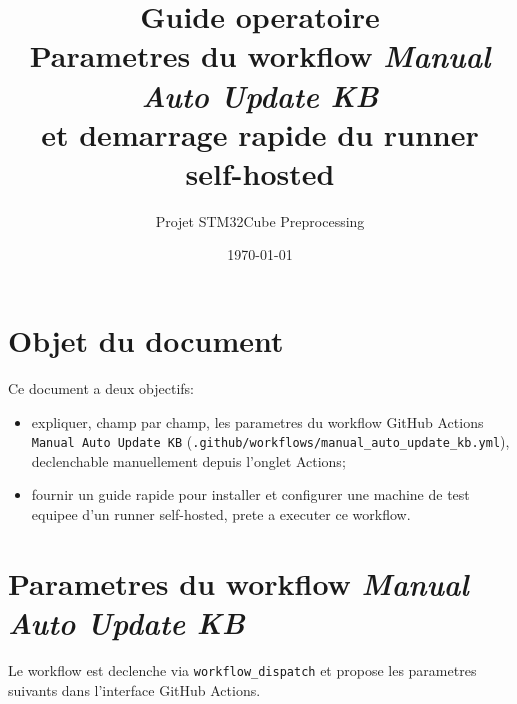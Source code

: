 \documentclass[11pt,a4paper]{article}
\title{Guide operatoire\\Parametres du workflow \emph{Manual Auto Update KB}\\et demarrage rapide du runner self-hosted}
\author{Projet STM32Cube Preprocessing}
\date{\today}
\begin{document}
\maketitle
\tableofcontents
\newpage

\section{Objet du document}
Ce document a deux objectifs:
\begin{itemize}[leftmargin=*]
  \item expliquer, champ par champ, les parametres du workflow GitHub Actions
  \texttt{Manual Auto Update KB} (\texttt{.github/workflows/manual\_auto\_update\_kb.yml}),
  declenchable manuellement depuis l'onglet Actions;
  \item fournir un guide rapide pour installer et configurer une machine de test
  equipee d'un runner self-hosted, prete a executer ce workflow.
\end{itemize}

\section{Parametres du workflow \emph{Manual Auto Update KB}}
Le workflow est declenche via \texttt{workflow\_dispatch} et propose les
parametres suivants dans l'interface GitHub Actions.
\end{document}
